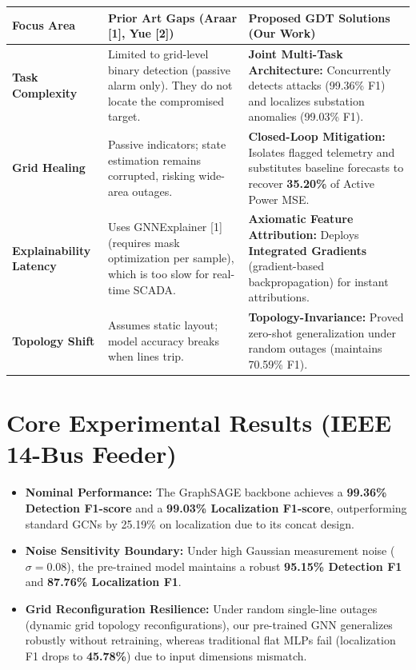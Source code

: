 \documentclass[11pt]{article}
\begin{document}
\begin{table}[h!]
\centering
\small
\renewcommand{\arraystretch}{1.3}
\begin{tabular}{p{3.2cm}p{6.2cm}p{6.2cm}}
\toprule
\textbf{Focus Area} & \textbf{Prior Art Gaps (Araar [1], Yue [2])} & \textbf{Proposed GDT Solutions (Our Work)} \\
\midrule
\textbf{Task Complexity} & Limited to grid-level binary detection (passive alarm only). They do not locate the compromised target. & \textbf{Joint Multi-Task Architecture:} Concurrently detects attacks (99.36\% F1) and localizes substation anomalies (99.03\% F1). \\
\textbf{Grid Healing} & Passive indicators; state estimation remains corrupted, risking wide-area outages. & \textbf{Closed-Loop Mitigation:} Isolates flagged telemetry and substitutes baseline forecasts to recover \textbf{35.20\%} of Active Power MSE. \\
\textbf{Explainability Latency} & Uses GNNExplainer [1] (requires mask optimization per sample), which is too slow for real-time SCADA. & \textbf{Axiomatic Feature Attribution:} Deploys \textbf{Integrated Gradients} (gradient-based backpropagation) for instant attributions. \\
\textbf{Topology Shift} & Assumes static layout; model accuracy breaks when lines trip. & \textbf{Topology-Invariance:} Proved zero-shot generalization under random outages (maintains 70.59\% F1). \\
\bottomrule
\end{tabular}
\end{table}

\section{Core Experimental Results (IEEE 14-Bus Feeder)}
\begin{itemize}[leftmargin=*]
    \item \textbf{Nominal Performance:} The GraphSAGE backbone achieves a \textbf{99.36\% Detection F1-score} and a \textbf{99.03\% Localization F1-score}, outperforming standard GCNs by 25.19\% on localization due to its concat design.
    \item \textbf{Noise Sensitivity Boundary:} Under high Gaussian measurement noise ($\sigma = 0.08$), the pre-trained model maintains a robust \textbf{95.15\% Detection F1} and \textbf{87.76\% Localization F1}.
    \item \textbf{Grid Reconfiguration Resilience:} Under random single-line outages (dynamic grid topology reconfigurations), our pre-trained GNN generalizes robustly without retraining, whereas traditional flat MLPs fail (localization F1 drops to \textbf{45.78\%}) due to input dimensions mismatch.
\end{itemize}
\end{document}
